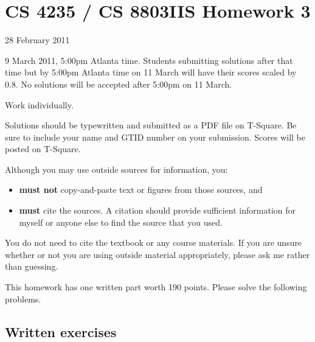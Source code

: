 \documentclass[letterpaper]{article}
\title{}
\date{}
\begin{document}
\thispagestyle{empty}

\section*{CS 4235 / CS 8803IIS Homework 3}

 28 February 2011

 9 March 2011, 5:00pm Atlanta time. Students submitting solutions after that time but by 5:00pm Atlanta time on 11 March will have their scores scaled by 0.8. No solutions will be accepted after 5:00pm on 11 March.

 Work individually.

\bigskip\noindent
Solutions should be typewritten and submitted as a PDF file on T-Square. Be sure to include your name and GTID number on your submission. Scores will be posted on T-Square.

\bigskip\noindent
Although you may use outside sources for information, you:
\begin{itemize}
\item {\bf must not} copy-and-paste text or figures from those sources, and
\item {\bf must} cite the sources. A citation should provide sufficient information for myself or anyone else to find the source that you used.
\end{itemize}
You do not need to cite the textbook or any course materials. If you are unsure whether or not you are using outside material appropriately, please ask me rather than guessing.

This homework has one written part worth 190 points. Please solve the following problems.

\subsection*{Written exercises}
\end{document}

